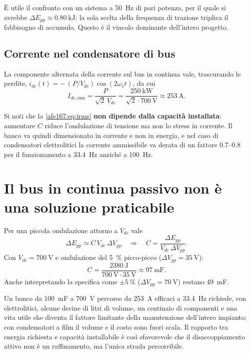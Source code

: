 È utile il confronto con un sistema a \SI{50}{\hertz} di pari potenza, per il quale si
avrebbe $\Delta E_{pp}\approx\SI{0.80}{\kilo\joule}$: la sola scelta della frequenza di
trazione triplica il fabbisogno di accumulo. Questo è il vincolo dominante dell'intero
progetto.

\subsection{Corrente nel condensatore di bus}

La componente alternata della corrente sul bus in continua vale, trascurando le perdite,
$i_{dc}(t) = -\,(P/V_{dc})\cos(2\omega_1 t)$, da cui
\begin{equation}
I_{dc,\mathrm{rms}} = \frac{P}{\sqrt{2}\,V_{dc}}
= \frac{\SI{250}{\kilo\watt}}{\sqrt{2}\cdot\SI{700}{\volt}}
\approx \SI{253}{\ampere}.
\label{afe167:eq:irms}
\end{equation}

Si noti che la \eqref{afe167:eq:irms} \textbf{non dipende dalla capacità installata}: aumentare
$C$ riduce l'ondulazione di tensione ma non lo stress in corrente. Il banco va quindi
dimensionato in corrente e non in energia, e nel caso di condensatori elettrolitici la
corrente ammissibile va derata di un fattore \num{0.7}--\num{0.8} per il funzionamento a
\SI{33.4}{\hertz} anziché a \SI{100}{\hertz}.

\section{Il bus in continua passivo non è una soluzione praticabile}

Per una piccola ondulazione attorno a $V_{dc}$ vale
\begin{equation}
\Delta E_{pp} \simeq C\, V_{dc}\, \Delta V_{pp}
\quad\Longrightarrow\quad
C = \frac{\Delta E_{pp}}{V_{dc}\,\Delta V_{pp}} .
\label{afe167:eq:capacita}
\end{equation}
Con $V_{dc}=\SI{700}{\volt}$ e ondulazione del \SI{5}{\percent} picco-picco
($\Delta V_{pp}=\SI{35}{\volt}$):
\begin{equation}
C = \frac{\SI{2380}{\joule}}{\SI{700}{\volt}\cdot\SI{35}{\volt}} \approx \SI{97}{\milli\farad}.
\end{equation}
Anche interpretando la specifica come $\pm\SI{5}{\percent}$ ($\Delta V_{pp}=\SI{70}{\volt}$)
restano \SI{49}{\milli\farad}.

Un banco da \SI{100}{\milli\farad} a \SI{700}{\volt} percorso da \SI{253}{\ampere} efficaci
a \SI{33.4}{\hertz} richiede, con elettrolitici, alcune decine di litri di volume, un
centinaio di componenti e una vita utile che diventa il fattore limitante della
manutenzione dell'intero impianto; con condensatori a film il volume e il costo sono
fuori scala. Il rapporto tra energia richiesta e capacità installabile è così sfavorevole
che il disaccoppiamento attivo non è un raffinamento, ma l'unica strada percorribile.

